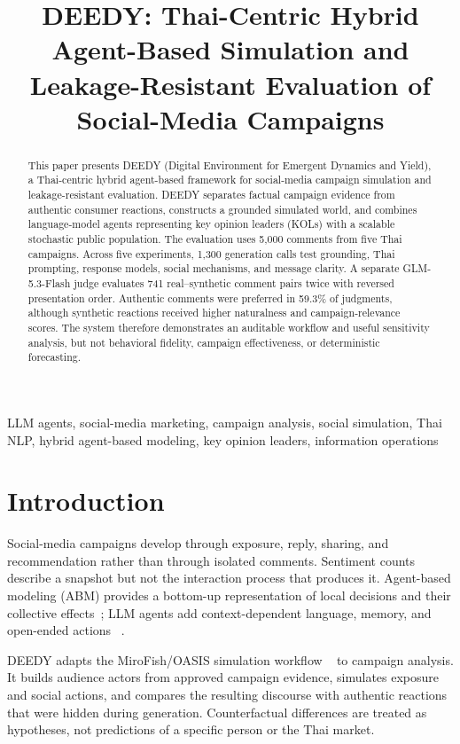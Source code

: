 \documentclass[conference]{IEEEtran}
\title{DEEDY: Thai-Centric Hybrid Agent-Based Simulation and
Leakage-Resistant Evaluation of Social-Media Campaigns}
\author{\IEEEauthorblockN{Anonymous Author(s)}}
\begin{document}
\maketitle

\begin{abstract}
This paper presents DEEDY (Digital Environment for Emergent Dynamics and
Yield), a Thai-centric hybrid agent-based framework for social-media campaign
simulation and leakage-resistant evaluation. DEEDY separates factual campaign
evidence from authentic
consumer reactions, constructs a grounded simulated world, and combines
language-model agents representing key opinion leaders (KOLs) with a scalable
stochastic public population. The evaluation
uses 5,000 comments from five Thai campaigns. Across five experiments, 1,300
generation calls test grounding, Thai prompting, response models, social
mechanisms, and message clarity. A separate GLM-5.3-Flash judge evaluates 741
real--synthetic comment pairs twice with reversed presentation order. Authentic
comments were preferred in 59.3\% of judgments, although synthetic reactions
received higher naturalness and campaign-relevance scores. The system therefore
demonstrates an auditable workflow and useful sensitivity analysis, but not
behavioral fidelity, campaign effectiveness, or deterministic forecasting.
\end{abstract}

\begin{IEEEkeywords}
LLM agents, social-media marketing, campaign analysis, social simulation, Thai
NLP, hybrid agent-based modeling, key opinion leaders, information operations
\end{IEEEkeywords}

\section{Introduction}

Social-media campaigns develop through exposure, reply, sharing, and
recommendation rather than through isolated comments. Sentiment counts describe
a snapshot but not the interaction process that produces it. Agent-based
modeling (ABM) provides a bottom-up representation of local decisions and their
collective effects~\cite{macal2010tutorial}; LLM agents add context-dependent
language, memory, and open-ended actions
~\cite{park2023generative}.

DEEDY adapts the MiroFish/OASIS simulation workflow
~\cite{mirofish2026,yang2024oasis} to campaign analysis. It builds audience
actors from approved campaign evidence, simulates exposure and social actions,
and compares the resulting discourse with authentic reactions that were hidden
during generation. Counterfactual differences are treated as hypotheses, not
predictions of a specific person or the Thai market.
\end{document}
